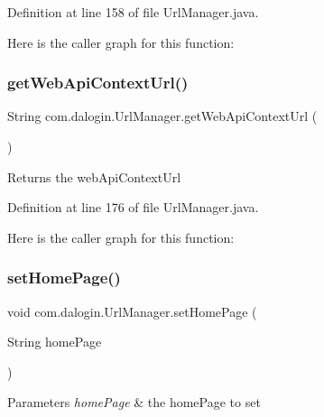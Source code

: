 Definition at line 158 of file Url\+Manager.\+java.

Here is the caller graph for this function\+:
\mbox{\label{classcom_1_1dalogin_1_1_url_manager_aad597875cd0f6bc45cd2ba822834351b}} 
\subsubsection{\texorpdfstring{get\+Web\+Api\+Context\+Url()}{getWebApiContextUrl()}}
{\footnotesize\ttfamily String com.\+dalogin.\+Url\+Manager.\+get\+Web\+Api\+Context\+Url (\begin{DoxyParamCaption}{ }\end{DoxyParamCaption})}

\begin{DoxyReturn}{Returns}
the web\+Api\+Context\+Url 
\end{DoxyReturn}


Definition at line 176 of file Url\+Manager.\+java.

Here is the caller graph for this function\+:
\mbox{\label{classcom_1_1dalogin_1_1_url_manager_adfc73042e559d077aaecc63ac7a98982}} 
\subsubsection{\texorpdfstring{set\+Home\+Page()}{setHomePage()}}
{\footnotesize\ttfamily void com.\+dalogin.\+Url\+Manager.\+set\+Home\+Page (\begin{DoxyParamCaption}\item[{String}]{home\+Page }\end{DoxyParamCaption})}


\begin{DoxyParams}{Parameters}
{\em home\+Page} & the home\+Page to set \\
\hline
\end{DoxyParams}


